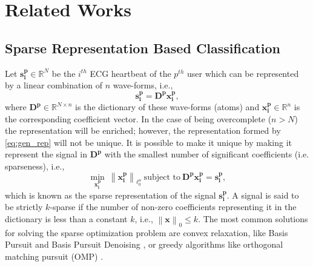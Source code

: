 \documentclass[journal,transmag]{IEEEtran}
\begin{document}
\section{Related Works}
\label{sec:literature}
\subsection{Sparse Representation Based Classification}
\label{sec:SAE}
Let $\bm{s_{i}^p} \in \mathbb{R}^N$ be the $i^{th}$ ECG heartbeat of the $p^{th}$ user which can be represented \cite{carrera2016ecg} by a linear combination of $n$ wave-forms, i.e.,
\begin{equation}
\bm{s^p_i}=   \bm{{D^p}} \bm{x^p_i}, \label{eq:gen_rep}
\end{equation}
where $\bm{D^p} \in \mathbb{R}^{N \times n} $ is the dictionary of these wave-forms (atoms) and $\bm{x^p_i} \in \mathbb{R}^{n}$ is the corresponding coefficient vector. In the case of being overcomplete ($n > N$) the representation will be enriched; however, the representation formed by \eqref{eq:gen_rep} will not be unique. It is possible to make it unique by making it represent the signal in $\bm{D^p}$ with the smallest number of significant coefficients (i.e. sparseness), i.e., 
\begin{equation}
\min_{\bm{x^p_i}} ~ \left\| \bm{x^p_i} \right\|_{\ell_0^n}~ \text{subject to}~ \bm{D^p} \bm{x^p_i}=\bm{s^p_i} ,\label{eq:sparse_rep}
\end{equation}
which is known as the sparse representation of the signal $\bm{s^p_i}$. A signal is said to be strictly $k$-sparse if the number of non-zero coefficients representing it in the dictionary is less than a constant $k$, i.e., $\left\| \bm{x} \right\|_0 \leq k$. The most common solutions for solving the sparse optimization problem are convex relaxation, like Basis Pursuit and Basis Pursuit Denoising \cite{BP}, or greedy algorithms like orthogonal matching pursuit (OMP) \cite{OMP1}.
\end{document}
